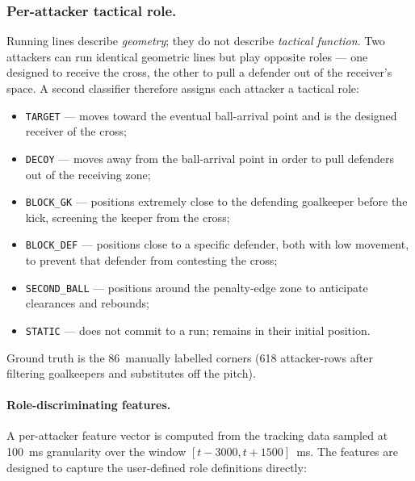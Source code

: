 \subsubsection{Per-attacker tactical role.}
Running lines describe \emph{geometry}; they do not describe \emph{tactical
function}. Two attackers can run identical geometric lines but play opposite
roles — one designed to receive the cross, the other to pull a defender out
of the receiver's space. A second classifier therefore assigns each attacker a
tactical role:
\begin{itemize}
  \item \texttt{TARGET} — moves toward the eventual ball-arrival point and is
        the designed receiver of the cross;
  \item \texttt{DECOY} — moves away from the ball-arrival point in order to
        pull defenders out of the receiving zone;
  \item \texttt{BLOCK\_GK} — positions extremely close to the defending
        goalkeeper before the kick, screening the keeper from the cross;
  \item \texttt{BLOCK\_DEF} — positions close to a specific defender, both
        with low movement, to prevent that defender from contesting the cross;
  \item \texttt{SECOND\_BALL} — positions around the penalty-edge zone to
        anticipate clearances and rebounds;
  \item \texttt{STATIC} — does not commit to a run; remains in their initial
        position.
\end{itemize}
Ground truth is the 86~manually labelled corners (618 attacker-rows after
filtering goalkeepers and substitutes off the pitch).

\paragraph{Role-discriminating features.}
A per-attacker feature vector is computed from the tracking data sampled at
100~ms granularity over the window $[t-3000, t+1500]$~ms. The features are
designed to capture the user-defined role definitions directly:

